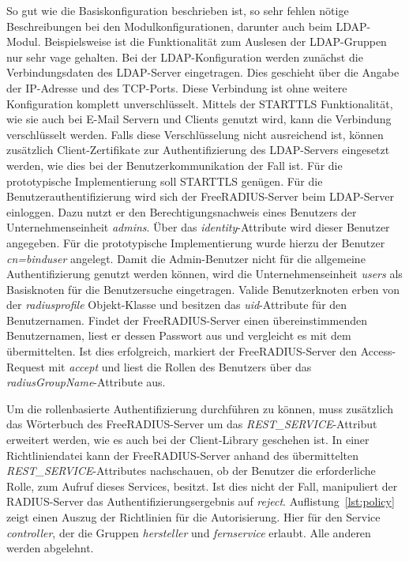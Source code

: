 \documentclass[11pt,a4paper]{report}
\begin{document}
So gut wie die Basiskonfiguration beschrieben ist, so sehr fehlen nötige Beschreibungen bei den Modulkonfigurationen, darunter auch beim LDAP-Modul. Beispielsweise ist die Funktionalität zum Auslesen der LDAP-Gruppen nur sehr vage gehalten. Bei der LDAP-Konfiguration werden zunächst die Verbindungsdaten des LDAP-Server eingetragen. Dies geschieht über die Angabe der IP-Adresse und des TCP-Ports. Diese Verbindung ist ohne weitere Konfiguration komplett unverschlüsselt. Mittels der STARTTLS Funktionalität, wie sie auch bei E-Mail Servern und Clients genutzt wird, kann die Verbindung verschlüsselt werden. Falls diese Verschlüsselung nicht ausreichend ist, können zusätzlich  Client-Zertifikate zur Authentifizierung des LDAP-Servers eingesetzt werden, wie dies bei der Benutzerkommunikation der Fall ist. Für die prototypische Implementierung soll STARTTLS genügen. Für die Benutzerauthentifizierung wird sich der FreeRADIUS-Server beim LDAP-Server einloggen. Dazu nutzt er den Berechtigungsnachweis eines Benutzers der Unternehmenseinheit \textit{admins}. Über das \textit{identity}-Attribute wird dieser Benutzer angegeben. Für die prototypische Implementierung wurde hierzu der Benutzer \textit{cn=binduser} angelegt. Damit die Admin-Benutzer nicht für die allgemeine Authentifizierung genutzt werden können, wird die Unternehmenseinheit \textit{users} als Basisknoten für die Benutzersuche eingetragen. Valide Benutzerknoten erben von der \textit{radiusprofile} Objekt-Klasse und besitzen das \textit{uid}-Attribute für den Benutzernamen. Findet der FreeRADIUS-Server einen übereinstimmenden Benutzernamen, liest er dessen Passwort aus und vergleicht es mit dem übermittelten. Ist dies erfolgreich, markiert der FreeRADIUS-Server den Access-Request mit \textit{accept} und liest die Rollen des Benutzers über das \textit{radiusGroupName}-Attribute aus. 

Um die rollenbasierte Authentifizierung durchführen zu können, muss zusätzlich das Wörterbuch des FreeRADIUS-Server um das \textit{REST\_SERVICE}-Attribut erweitert werden, wie es auch bei der Client-Library geschehen ist. In einer Richtliniendatei kann der FreeRADIUS-Server anhand des übermittelten \textit{REST\_SERVICE}-Attributes nachschauen, ob der Benutzer die erforderliche Rolle, zum Aufruf dieses Services, besitzt. Ist dies nicht der Fall, manipuliert der RADIUS-Server das Authentifizierungsergebnis auf \textit{reject}. Auflistung~\ref{lst:policy} zeigt einen Auszug der Richtlinien für die Autorisierung. Hier für den Service \textit{controller}, der die Gruppen \textit{hersteller} und \textit{fernservice} erlaubt. Alle anderen werden abgelehnt.
\end{document}
